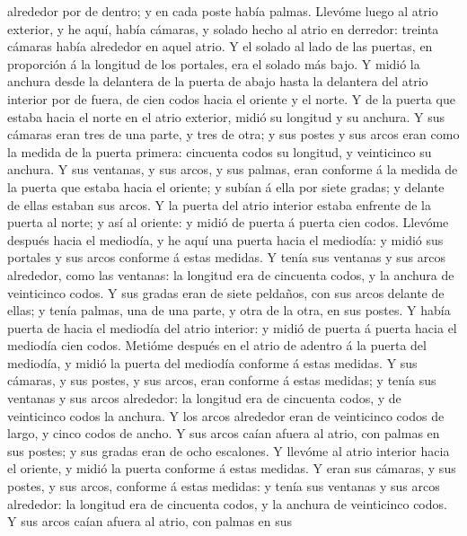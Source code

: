 alrededor por de dentro; y en cada poste había palmas. 
Llevóme luego al atrio exterior, y he aquí, había cámaras, y solado
hecho al atrio en derredor: treinta cámaras había alrededor en aquel
atrio.  Y el solado al lado de las puertas, en proporción á
la longitud de los portales, era el solado más bajo.  Y
midió la anchura desde la delantera de la puerta de abajo hasta la
delantera del atrio interior por de fuera, de cien codos hacia el
oriente y el norte.  Y de la puerta que estaba hacia el
norte en el atrio exterior, midió su longitud y su anchura.
 Y sus cámaras eran tres de una parte, y tres de otra; y
sus postes y sus arcos eran como la medida de la puerta primera:
cincuenta codos su longitud, y veinticinco su anchura.  Y
sus ventanas, y sus arcos, y sus palmas, eran conforme á la medida de la
puerta que estaba hacia el oriente; y subían á ella por siete gradas; y
delante de ellas estaban sus arcos.  Y la puerta del atrio
interior estaba enfrente de la puerta al norte; y así al oriente: y
midió de puerta á puerta cien codos.  Llevóme después hacia
el mediodía, y he aquí una puerta hacia el mediodía: y midió sus
portales y sus arcos conforme á estas medidas.  Y tenía sus
ventanas y sus arcos alrededor, como las ventanas: la longitud era de
cincuenta codos, y la anchura de veinticinco codos.  Y sus
gradas eran de siete peldaños, con sus arcos delante de ellas; y tenía
palmas, una de una parte, y otra de la otra, en sus postes.
 Y había puerta de hacia el mediodía del atrio interior: y
midió de puerta á puerta hacia el mediodía cien codos. 
Metióme después en el atrio de adentro á la puerta del mediodía, y midió
la puerta del mediodía conforme á estas medidas.  Y sus
cámaras, y sus postes, y sus arcos, eran conforme á estas medidas; y
tenía sus ventanas y sus arcos alrededor: la longitud era de cincuenta
codos, y de veinticinco codos la anchura.  Y los arcos
alrededor eran de veinticinco codos de largo, y cinco codos de ancho.
 Y sus arcos caían afuera al atrio, con palmas en sus
postes; y sus gradas eran de ocho escalones.  Y llevóme al
atrio interior hacia el oriente, y midió la puerta conforme á estas
medidas.  Y eran sus cámaras, y sus postes, y sus arcos,
conforme á estas medidas: y tenía sus ventanas y sus arcos alrededor: la
longitud era de cincuenta codos, y la anchura de veinticinco codos.
 Y sus arcos caían afuera al atrio, con palmas en sus
